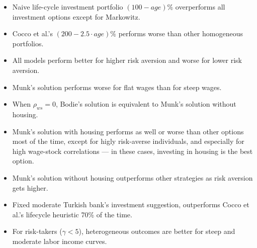 \begin{itemize}

\item Naive life-cycle investment portfolio $(100-age)\%$ overperforms all investment options except for Markowitz.
\item Cocco et al.'s $(200-2.5\cdot age)\%$ performs worse than other homogeneous portfolios.
\item All models perform better for higher risk aversion and worse for lower risk aversion.
\item Munk's solution performs worse for flat wages than for steep wages.
\item When $\rho_{ws}=0$, Bodie's solution is equivalent to Munk's solution without housing.
\item Munk's solution with housing performs as well or worse than other options most of the time, except for higly risk-averse individuals, and especially for high wage-stock correlations --- in these cases, investing in housing is the best option. 
\item Munk's solution without housing outperforms other strategies as risk aversion gets higher.
\item Fixed moderate Turkish bank's investment suggestion, outperforms Cocco et al.'s lifecycle heuristic 70\% of the time.
\item For risk-takers ($\gamma < 5$), heterogeneous outcomes are better for steep and moderate labor income curves.
\end{itemize}

